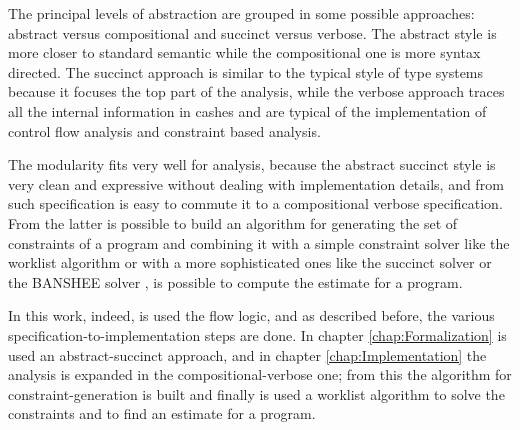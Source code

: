 The principal levels of abstraction are grouped in some possible approaches: abstract versus compositional and succinct versus verbose. The abstract style is more closer to standard semantic while the compositional one is more syntax directed. The succinct approach is similar to the typical style of type systems because it focuses the top part of the analysis, while the verbose approach traces all the internal information in cashes and are typical of the implementation of control flow analysis and constraint based analysis.


The modularity fits very well for analysis, because the abstract succinct style is very clean and expressive without dealing with implementation details, and from such specification is easy to commute it to a compositional verbose specification. From the latter is possible to build an algorithm for generating the set of constraints of a program and combining it with a simple constraint solver like the worklist algorithm \cite{PrincipleProgramAnalysis} or with a more sophisticated ones like the succinct solver \cite{SuccinctSolver} or the BANSHEE solver \cite{BansheeSolver}, is possible to compute the estimate for a program. 

In this work, indeed, is used the flow logic, and as described before, the various specification-to-implementation steps are done. In chapter \ref{chap:Formalization} is used an abstract-succinct approach, and in chapter \ref{chap:Implementation} the analysis is expanded in the compositional-verbose one; from this the algorithm for constraint-generation is built and finally is used a worklist algorithm to solve the constraints and to find an estimate for a program. 